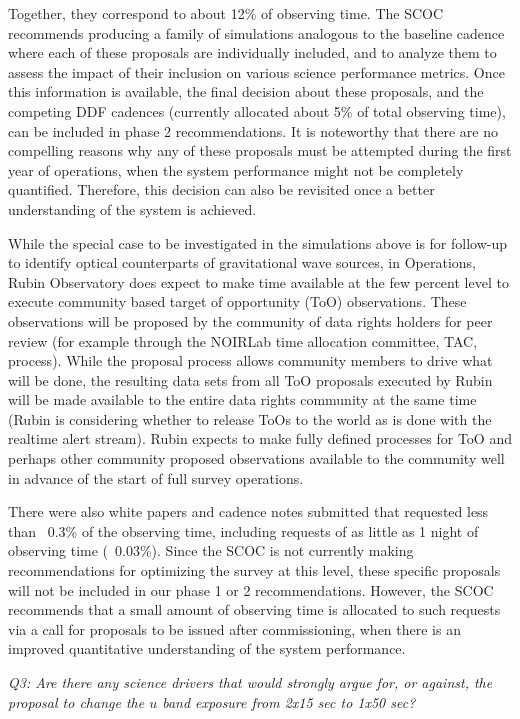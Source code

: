 Together, they correspond to about 12\% of observing time. The SCOC recommends producing a family of simulations analogous to the baseline cadence where each of these proposals are individually included, and to analyze them to assess the impact of their inclusion on various science performance metrics. Once this information is available, the final decision about these proposals, and the competing DDF cadences (currently allocated about 5\% of total observing time), can be included in phase 2 recommendations. It is noteworthy that there are no compelling reasons why any of these proposals must be attempted during the first year of operations, when the system performance might not be completely quantified. Therefore, this decision can also be revisited once a better understanding of the system is achieved.

While the special case to be investigated in the simulations above is for follow-up to identify optical counterparts of gravitational wave sources, in Operations, Rubin Observatory does expect to make time available at the few percent level to execute community based target of opportunity (ToO) observations. These observations will be proposed by the community of data rights holders for peer review (for example through the NOIRLab time allocation committee, TAC, process). While the proposal process allows community members to drive what will be done, the resulting data sets from all ToO proposals executed by Rubin will be made available to the entire data rights community at the same time (Rubin is considering whether to release ToOs to the world as is done with the realtime alert stream). Rubin expects to make fully defined processes for ToO and perhaps other community proposed observations available to the community well in advance of the start of full survey operations.

There were also white papers and cadence notes submitted that requested less than ~0.3\% of the observing time, including requests of as little as 1 night of observing time (~0.03\%). Since the SCOC is not currently making recommendations for optimizing the survey at this level, these specific proposals will not be included in our phase 1 or 2 recommendations. However, the SCOC recommends that a small amount of observing time is allocated to such requests via a call for proposals to be issued after commissioning, when there is an improved quantitative understanding of the system performance. 

{\it Q3:  Are there any science drivers that would strongly argue for, or against, the proposal to change the $u$ band exposure from 2x15 sec to 1x50 sec? }

